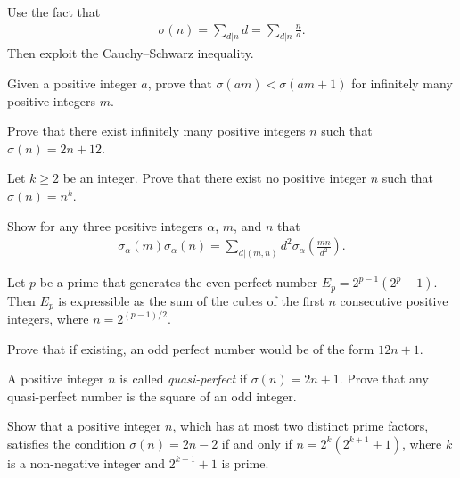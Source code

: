 \documentclass[12pt]{subfile}
\begin{document}
	\begin{hint}
		Use the fact that
			\begin{align*}
				\sigma(n)=\sum\limits_{d|n} d =  \sum\limits_{d|n} \frac{n}{d}.
			\end{align*}
		Then exploit the Cauchy--Schwarz inequality.
	\end{hint}

		\begin{problem}[Romania TST 2010] %
		Given a positive integer $a$, prove that $\sigma(am) < \sigma(am + 1)$ for infinitely many positive integers $m$. 
	\end{problem}
	
	\begin{problem}
		Prove that there exist infinitely many positive integers $n$ such that $\sigma(n)=2n+12$.
	\end{problem}
	
	\begin{problem}
		Let $k\geq 2$ be an integer. Prove that there exist no positive integer $n$ such that $\sigma(n)=n^k$.
	\end{problem}
	
	\begin{problem}
		Show for any three positive integers $\alpha$, $m$, and $n$ that
			\begin{align*}
				\sigma_{\alpha} (m)\sigma_{\alpha} (n) = \sum_{d|(m,n)} d^2 \sigma_{\alpha} \left(\frac{mn}{d^2}\right).
			\end{align*}
	\end{problem}
	\begin{problem}
		Let $p$ be a prime that generates the even perfect number $E_p=2^{p-1}(2^p-1)$. Then $E_p$ is expressible as the sum of the cubes of the first $n$ consecutive positive integers, where $n=2^{(p-1)/2}$.
	\end{problem}
	
	\begin{problem}
		Prove that if existing, an odd perfect number would be of the form $12n+1$.
	\end{problem}
	
	\begin{problem}[Putnam 1976]
		A positive integer $n$ is called \textit{quasi-perfect} if $\sigma(n)=2n+1$. Prove that any quasi-perfect number is the square of an odd integer.
	\end{problem}
	
	
	\begin{problem}
		Show that a positive integer $n$, which has at most two distinct prime factors, satisfies the condition $\sigma(n)=2n-2$ if and only if $n=2^k(2^{k+1}+1)$, where $k$ is a non-negative integer and $2^{k+1}+1$ is prime.
	\end{problem}
	
\end{document}
